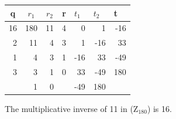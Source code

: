 \documentclass[a4paper]{exam}
\begin{document}
\begin{questions}
        \begin{solution}
            \begin{table}[H]
                \begin{center}
                    \begin{tabular}{|r|r|r|r|r|r|r|}
                    \hline
                    \multicolumn{1}{|c|}{\textbf{q}}               & \multicolumn{1}{c|}{\textbf{$r_1$}} & \multicolumn{1}{c|}{\textbf{$r_2$}} & \multicolumn{1}{c|}{\textbf{r}}               & \multicolumn{1}{l|}{\textbf{$t_1$}} & \multicolumn{1}{l|}{\textbf{$t_2$}} & \multicolumn{1}{l|}{\textbf{t}}               \\ \hline
                    16                                             & 180                                 & 11                                  & 4                                             & 0                                   & 1                                   & -16                                           \\ \hline
                    2                                              & 11                                  & 4                                   & 3                                             & 1                                   & -16                                 & 33                                            \\ \hline
                    1                                              & 4                                   & 3                                   & 1                                             & -16                                 & 33                                  & -49                                           \\ \hline
                    3                                              & 3                                   & 1                                   & 0                                             & 33                                  & -49                                 & 180                                           \\ \hline
                    \multicolumn{1}{|l|}{}                         & 1                                   & 0                                   & \multicolumn{1}{l|}{}                         & -49                                 & 180                                 & \multicolumn{1}{l|}{} \\ \hline
                    \end{tabular}
                \end{center}
            \end{table}
            The multiplicative inverse of 11 in ($\text{Z}_{180}$) is 16.
        \end{solution}


\end{questions}
\end{document}
